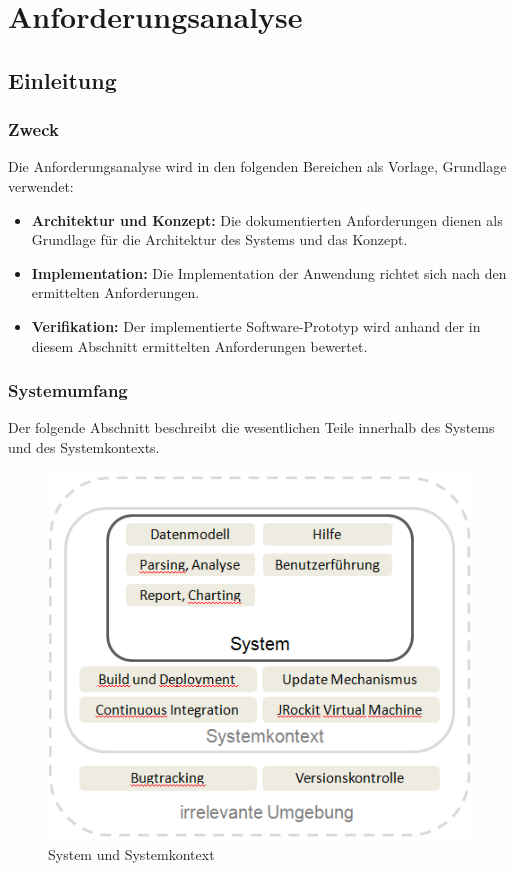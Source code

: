 \chapter{Anforderungsanalyse}\label{anforderungsanalyse}
\section{Einleitung}
\subsection{Zweck}
Die Anforderungsanalyse wird in den folgenden Bereichen als Vorlage, Grundlage verwendet:
\begin{itemize}
	\item \textbf{Architektur und Konzept:}  Die dokumentierten Anforderungen dienen als Grundlage für die Architektur des Systems und das Konzept. 
	\item \textbf{Implementation:} Die Implementation der Anwendung richtet sich nach den ermittelten Anforderungen. 
	\item \textbf{Verifikation:} Der implementierte Software-Prototyp wird anhand der in diesem Abschnitt ermittelten Anforderungen bewertet. 
\end{itemize}

\subsection{Systemumfang}
Der folgende Abschnitt beschreibt die wesentlichen Teile innerhalb des Systems und des Systemkontexts. 
 \begin{figure}[H]
  	\centering
    	\includegraphics{images/systemumfang}
        	\caption{System und Systemkontext}
\end{figure}

